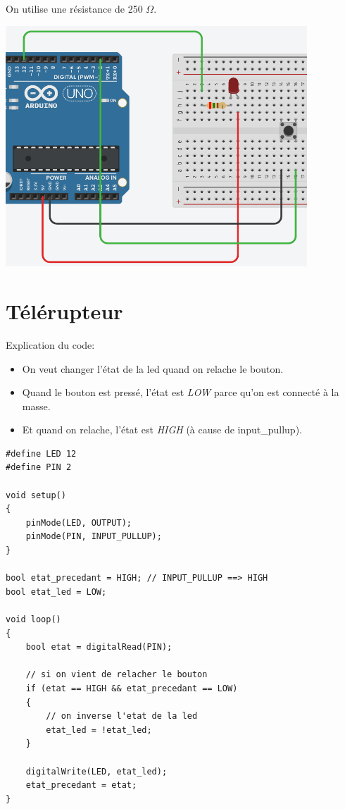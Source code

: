 \documentclass[a4paper]{article}
\begin{document}
On utilise une résistance de 250 $ \Omega $.
\begin{center}
    \includegraphics[width=0.85\textwidth]{images/labo1-manip2.PNG}
\end{center}










\section{Télérupteur}





Explication du code:
\begin{itemize}
    \item On veut changer l'état de la led quand on relache le bouton.
    \item Quand le bouton est pressé, l'état est \textit{LOW} parce qu'on est connecté à la masse.
    \item Et quand on relache, l'état est \textit{HIGH} (à cause de input\_pullup).
\end{itemize}

\begin{lstlisting}[frame=single]
#define LED 12
#define PIN 2

void setup()
{
    pinMode(LED, OUTPUT);
    pinMode(PIN, INPUT_PULLUP);
}

bool etat_precedant = HIGH; // INPUT_PULLUP ==> HIGH
bool etat_led = LOW;

void loop()
{
    bool etat = digitalRead(PIN);
    
    // si on vient de relacher le bouton
    if (etat == HIGH && etat_precedant == LOW)
    {
        // on inverse l'etat de la led
        etat_led = !etat_led;
    }
    
    digitalWrite(LED, etat_led);
    etat_precedant = etat;
}
\end{lstlisting}
\end{document}
